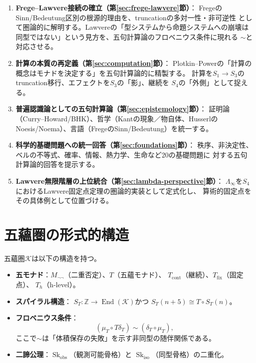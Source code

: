 \documentclass[11pt,a4paper]{ltjsarticle}
\theoremstyle{remark}
\newcommand{\Skobs}{\mathop{\mathrm{Sk}}_{\mathrm{obs}}}
\newcommand{\Skiso}{\mathop{\mathrm{Sk}}_{\mathrm{iso}}}
\newcommand{\End}{\operatorname{End}}
\newcommand{\LawvereInfinity}{\Lambda_\infty}
\begin{document}
\begin{enumerate}[label=\textbf{差分\arabic*：},leftmargin=6em]
  \item \textbf{Frege--Lawvere接続の確立（第\ref{sec:frege-lawvere}節）}：
  FregeのSinn/Bedeutung区別の根源的理由を、truncationの多対一性・非可逆性
  として圏論的に解明する。Lawvereの「型システムから命題システムへの崩壊は
  同型ではない」という見方を、五句計算論のフロベニウス条件に現れる
  $\sim$と対応させる。
  \item \textbf{計算の本質の再定義（第\ref{sec:computation}節）}：
  Plotkin--Powerの「計算の概念はモナドを決定する」を五句計算論的に精製する。
  計算を$S_1\to S_3$のtruncation移行、エフェクトを$S_3$の「影」、継続を
  $S_4$の「外側」として捉える。
  \item \textbf{普遍認識論としての五句計算論（第\ref{sec:epistemology}節）}：
  証明論（Curry--Howard/BHK）、哲学（Kantの現象／物自体、Husserlの
  Noesis/Noema）、言語（FregeのSinn/Bedeutung）を統一する。
  \item \textbf{科学的基礎問題への統一回答（第\ref{sec:foundations}節）}：
  秩序、非決定性、ベルの不等式、確率、情報、熱力学、生命など20の基礎問題に
  対する五句計算論的回答を提示する。
  \item \textbf{Lawvere無限階層の上位統合（第\ref{sec:lambda-perspective}節）}：
  $\LawvereInfinity$を$S_4$におけるLawvere固定点定理の圏論的実装として定式化し、
  算術的固定点をその具体例として位置づける。
\end{enumerate}

\section{五蘊圏の形式的構造}

五蘊圏$\mathcal{K}$は以下の構造を持つ。
\begin{itemize}
  \item \textbf{五モナド}：$M_{\neg\neg}$（二重否定）、$T$（五蘊モナド）、
  $T_{\mathrm{cont}}$（継続）、$T_{\mathrm{fix}}$（固定点）、
  $T_h$（h-level）。
  \item \textbf{スパイラル構造}：
  $S_T:\mathbb{Z}\to\End(\mathcal{K})$かつ
  $S_T(n+5)\cong T\circ S_T(n)$。
  \item \textbf{フロベニウス条件}：
  \[
    (\mu_T\circ T\delta_T)\sim(\delta_T\circ\mu_T),
  \]
  ここで$\sim$は「体積保存の失敗」を示す非同型の随伴関係である。
  \item \textbf{二諦公理}：$\Skobs$（観測可能骨格）と
  $\Skiso$（同型骨格）の二重化。
\end{itemize}
\end{document}

